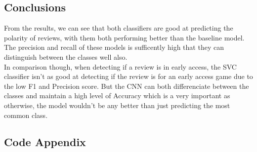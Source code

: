 \documentclass[11pt]{article} %
\begin{document}
\subsection{Conclusions}
From the results, we can see that both classifiers are good at predicting the polarity of reviews, with them both performing better than the baseline model. The precision and recall of these models is sufficently high that they can distinguish between the classes well also.
\\ In comparison though, when detecting if a review is in early access, the SVC classifier isn't as good at detecting if the review is for an early access game due to the low F1 and Precision score. But the CNN can both differenciate between the classes and maintain a high level of Accuracy which is a very important as otherwise, the model wouldn't be any better than just predicting the most common class.
\subsection{Code Appendix}
\end{document}
